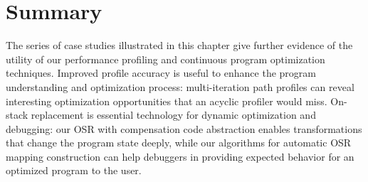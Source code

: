 \section{Summary}
The series of case studies illustrated in this chapter give further evidence of the utility of our performance profiling and continuous program optimization techniques. Improved profile accuracy is useful to enhance the program understanding and optimization process: multi-iteration path profiles can reveal interesting optimization opportunities that an acyclic profiler would miss. On-stack replacement is essential technology for dynamic optimization and debugging: our OSR with compensation code abstraction enables transformations that change the program state deeply, while our algorithms for automatic OSR mapping construction can help debuggers in providing expected behavior for an optimized program to the user.